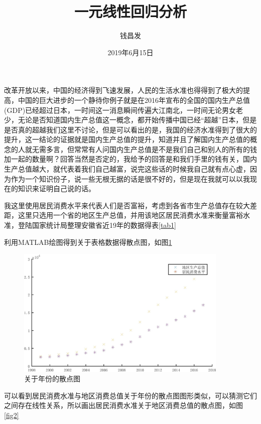 \documentclass[UTF8,oneside,cs4side]{ctexart}
\title{一元线性回归分析}
\author{钱昌发}
\date{2019年6月15日}
\begin{document}
	\maketitle
	\newpage
	改革开放以来，中国的经济得到飞速发展，人民的生活水准也得得到了极大的提高，中国的巨大进步的一个静待你例子就是在2016年宣布的全国的国内生产总值(GDP)已经超过日本，一时间这一消息瞬间传遍大江南北，一时间无论男女老少，无论是否知道国内生产总值这一概念，都开始传播中国已经``超越''日本，但是是否真的超越我们这里不讨论，但是可以看出的是，我国的经济水准得到了很大的提升，这一结论的证据就是国内生产总值的提升，知道并且了解国内生产总值的概念的人就无需多言，但常常有人问国内生产总值是不是我们自己和别人的所有的钱加一起的数量啊？回答当然是否定的，我给予的回答是和我们手里的钱有关，国内生产总值越大，就代表着我们自己越富，说完这些话的时候我自己就有点心虚，因为作为一个知识份子，说一些无根无据的话是很不好的，但是现在我就可以以我现在的知识来证明自己说的话。\par
	我这里使用居民消费水平来代表人们是否富裕，考虑到各省市生产总值存在较大差距，这里只选用一个省的地区生产总值，并用该地区居民消费水准来衡量富裕水准，登陆国家统计局整理安徽省近19年的数据得表\ref{tab1}\par
	利用MATLAB绘图得到关于表格数据得散点图，如图\ref{fig1}\par
	\begin{figure}[htb]
		\centering
		\includegraphics[width=0.9\textwidth]{fig1.jpg}
		\caption{关于年份的散点图}
		\label{fig1}
	\end{figure}
    可以看到居民消费水准与地区消费总值关于年份的散点图图形类似，可以猜测它们之间存在线性关系，所以画出居民消费水准关于地区消费总值的散点图，如图\ref{fig2}\par
\end{document}
